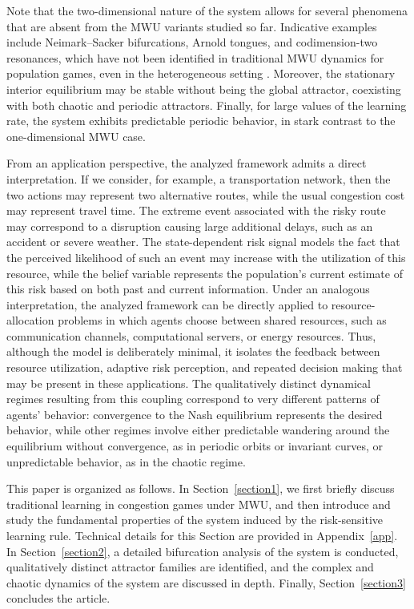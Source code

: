 \documentclass{article}
\theoremstyle{plain}
\theoremstyle{definition}
\begin{document}
Note that the two-dimensional nature of the system allows for several phenomena that are absent from the MWU variants studied so far. Indicative examples include Neimark--Sacker bifurcations, Arnold tongues, and codimension-two resonances, which have not been identified in traditional MWU dynamics for population games, even in the heterogeneous setting \cite{bielawski2}. Moreover, the stationary interior equilibrium may be stable without being the global attractor, coexisting with both chaotic and periodic attractors. Finally, for large values of the learning rate, the system exhibits predictable periodic behavior, in stark contrast to the one-dimensional MWU case.

From an application perspective, the analyzed framework admits a direct interpretation. If we consider, for example, a transportation network, then the two actions may represent two alternative routes, while the usual congestion cost may represent travel time. The extreme event associated with the risky route may correspond to a disruption causing large additional delays, such as an accident or severe weather. The state-dependent risk signal models the fact that the perceived likelihood of such an event may increase with the utilization of this resource, while the belief variable represents the population's current estimate of this risk based on both past and current information. Under an analogous interpretation, the analyzed framework can be directly applied to resource-allocation problems in which agents choose between shared resources, such as communication channels, computational servers, or energy resources. Thus, although the model is deliberately minimal, it isolates the feedback between resource utilization, adaptive risk perception, and repeated decision making that may be present in these applications. The qualitatively distinct dynamical regimes resulting from this coupling correspond to very different patterns of agents' behavior: convergence to the Nash equilibrium represents the desired behavior, while other regimes involve either predictable wandering around the equilibrium without convergence, as in periodic orbits or invariant curves, or unpredictable behavior, as in the chaotic regime.

This paper is organized as follows. In Section~\ref{section1}, we first briefly discuss traditional learning in congestion games under MWU, and then introduce and study the fundamental properties of the system induced by the risk-sensitive learning rule. Technical details for this Section are provided in Appendix~\ref{app}. In Section~\ref{section2}, a detailed bifurcation analysis of the system is conducted, qualitatively distinct attractor families are identified, and the complex and chaotic dynamics of the system are discussed in depth. Finally, Section~\ref{section3} concludes the article.
\end{document}
